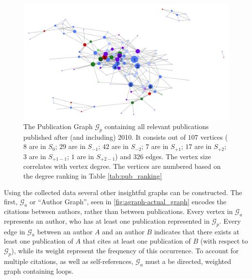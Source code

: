 \documentclass[11pt,a4paper]{book}
\theoremstyle{definition}
\theoremstyle{definition}
\theoremstyle{definition}
\theoremstyle{remark}
\newcommand{\psetz}{S_{\mathit{0}}}
\newcommand{\psetb}{S_{\mathit{-1}}}
\newcommand{\psetbb}{S_{\mathit{-2}}}
\newcommand{\psetf}{S_{\mathit{+1}}}
\newcommand{\psetff}{S_{\mathit{+2}}}
\newcommand{\psetfb}{S_{\mathit{+1-1}}}
\newcommand{\psetffb}{S_{\mathit{+2-1}}}
\newcommand{\pgraph}{\mathcal{G}_{p}}
\newcommand{\agraph}{\mathcal{G}_{a}}
\begin{document}
\begin{figure}[h!]
\includegraphics[width=\textwidth]{actual_graph.png}
\caption{The Publication Graph  $\pgraph$ containing all relevant publications published after (and including) 2010. It consists out of $107$ vertices ($8$ are in \textcolor{cstepz}{$\psetz$}; $29$ are in \textcolor{cstepb}{$\psetb$};
$42$ are in \textcolor{cstepbb}{$\psetbb$}; $7$ are in \textcolor{cstepf}{$\psetf$}; $17$ are in \textcolor{cstepff}{$\psetff$}; $3$ are in \textcolor{cstepfb}{$\psetfb$}; $1$ are in \textcolor{cstepffb}{$\psetffb$}) and $326$ edges.
The vertex size correlates with vertex degree. The vertices are numbered based on the degree ranking in Table \ref{tab:pub_ranking}}
\label{fig:pgraph-actual_graph}
\end{figure}




Using the collected data several other insightful graphs can be constructed. The first, $\agraph$  or ``Author Graph'', seen in \ref{fig:agraph-actual_graph} encodes the citations between authors, rather than between publications. Every vertex in $\agraph$ represents an author, who has at least one publication represented in $\pgraph$. Every edge in $\agraph$ between an author $A$ and an author $B$ indicates that there exists at least one publication of $A$ that cites at least one publication of $B$ (with respect to $\pgraph$), while its weight represent the frequency of this occurrence. To account for multiple citations, as well as self-references, $\agraph$ must a be directed, weighted graph containing loops.
\end{document}

